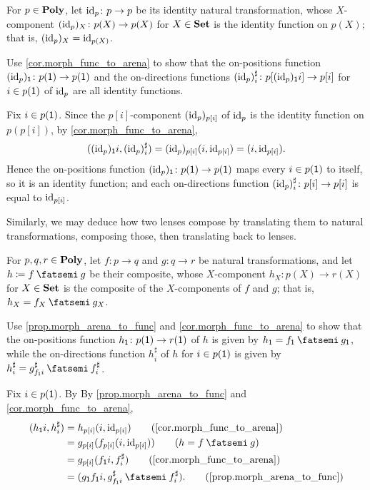 \documentclass[Book-Poly]{subfiles}
\begin{document}
\begin{exercise} \label{exc.arena_morph_id}
For $p\in\mathbf{Poly}$, let $\mathrm{id}_p \colon p \to p$ be its identity natural transformation, whose $X$-component $(\mathrm{id}_p)_X\colon p(X)\to p(X)$ for $X\in\mathbf{Set}$ is the identity function on $p(X)$; that is, $(\mathrm{id}_p)_X=\mathrm{id}_{p(X)}$.

Use \cref{cor.morph_func_to_arena} to show that the on-positions function $(\mathrm{id}_p)_{\textsf{1}}\colon p(\textsf{1})\to p(\textsf{1})$ and the on-directions functions $(\mathrm{id}_p)^\sharp_i\colon p[(\mathrm{id}_p)_{\textsf{1}}i]\to p[i]$ for $i\in p(\textsf{1})$ of $\mathrm{id}_p$ are all identity functions.
\begin{solution}
Fix $i\in p(\textsf{1})$.
Since the $p[i]$-component $(\mathrm{id}_p)_{p[i]}$ of $\mathrm{id}_p$ is the identity function on $p(p[i])$, by \cref{cor.morph_func_to_arena},
\[
    ((\mathrm{id}_p)_{\textsf{1}}i, (\mathrm{id}_p)^\sharp_i) = (\mathrm{id}_p)_{p[i]}(i,\mathrm{id}_{p[i]}) = (i,\mathrm{id}_{p[i]}).
\]
Hence the on-positions function $(\mathrm{id}_p)_{\textsf{1}}\colon p(\textsf{1})\to p(\textsf{1})$ maps every $i\in p(\textsf{1})$ to itself, so it is an identity function; and each on-directions function $(\mathrm{id}_p)^\sharp_i\colon p[i]\to p[i]$ is equal to $\mathrm{id}_{p[i]}$.
\end{solution}
\end{exercise}

Similarly, we may deduce how two lenses compose by translating them to natural transformations, composing those, then translating back to lenses.

\begin{exercise} \label{exc.arena_morph_comp}
For $p,q,r\in\mathbf{Poly}$, let $f\colon p\to q$ and $g\colon q\to r$ be natural transformations, and let $h\coloneqq f\then g$ be their composite, whose $X$-component $h_X\colon p(X)\to r(X)$ for $X\in\mathbf{Set}$ is the composite of the $X$-components of $f$ and $g$; that is, $h_X=f_X\then g_X$.

Use \cref{prop.morph_arena_to_func} and \cref{cor.morph_func_to_arena} to show that the on-positions function $h_{\textsf{1}}\colon p(\textsf{1})\to r(\textsf{1})$ of $h$ is given by $h_\1=f_\1\then g_\1$, while the on-directions function $h^\sharp_i$ of $h$ for $i\in p(\textsf{1})$ is given by $h^\sharp_i=g^\sharp_{f_\1i}\then f^\sharp_i$.
\begin{solution}
Fix $i\in p(\textsf{1})$.
By By \cref{prop.morph_arena_to_func} and \cref{cor.morph_func_to_arena},
\begin{align*}
    (h_\1i, h^\sharp_i) &= h_{p[i]}(i, \id_{p[i]}) \tag{\cref{cor.morph_func_to_arena}} \\
    &= g_{p[i]}(f_{p[i]}(i, \id_{p[i]})) \tag{$h = f \then g$} \\
    &= g_{p[i]}(f_\1i, f^\sharp_i) \tag{\cref{cor.morph_func_to_arena}} \\
    &= (g_\1f_\1i, g^\sharp_{f_\1i} \then f^\sharp_i). \tag{\cref{prop.morph_arena_to_func}}
\end{align*}
\end{solution}
\end{exercise}
\end{document}
